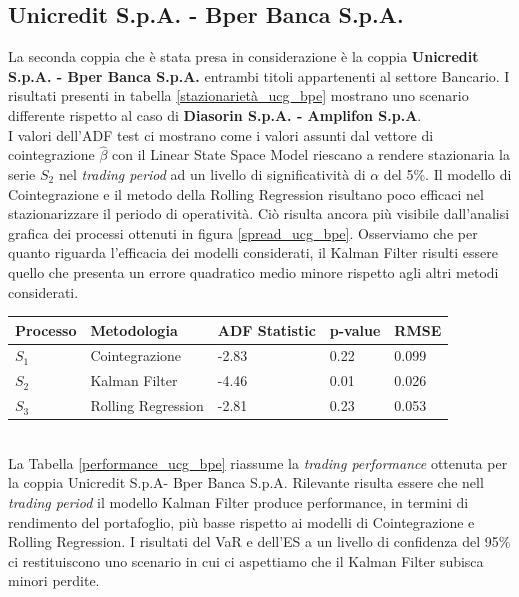 \documentclass[]{article}
\begin{document}
\break
\break
\subsection*{Unicredit S.p.A. - Bper Banca S.p.A.}
La seconda coppia che è stata presa in considerazione è la coppia \textbf{Unicredit S.p.A. - Bper Banca S.p.A.} entrambi titoli appartenenti al settore Bancario.
I risultati presenti in tabella \ref{stazionarietà_ucg_bpe} mostrano uno scenario differente rispetto al caso di \textbf{Diasorin S.p.A. - Amplifon S.p.A}.
\\
I valori dell'ADF test ci mostrano come  i valori assunti dal vettore di cointegrazione $\hat{\beta}$ con il Linear State Space Model riescano a rendere stazionaria la serie $S_2$ nel \textit{trading period} ad un livello di significatività di $\alpha$ del 5\%. 
Il modello di Cointegrazione e il metodo della Rolling Regression risultano poco efficaci nel stazionarizzare il periodo di operatività. Ciò risulta ancora più visibile dall'analisi grafica dei processi ottenuti in figura \ref{spread_ucg_bpe}.
Osserviamo che per quanto riguarda l'efficacia dei modelli considerati, il Kalman Filter risulti essere quello che presenta un errore quadratico medio minore rispetto agli altri metodi considerati.

\begin{center}
	\label{stazionarietà_ucg_bpe}
	\begin{tabular}{ p{2cm}p{3cm}p{1cm}p{2cm}p{1cm}}
	\hline
	Processo & Metodologia & ADF Statistic & p-value & RMSE \\
	\hline
	$S_1$ & Cointegrazione & -2.83 & 0.22 & 0.099 \\
	$S_2$ & Kalman Filter & -4.46 & 0.01  & 0.026 \\
	$S_3$ & Rolling Regression & -2.81 & 0.23 & 0.053 \\
	\hline
	\end{tabular}
\end{center}
\
\\
La Tabella \ref{performance_ucg_bpe} riassume la \textit{trading performance} ottenuta per la coppia Unicredit S.p.A- Bper Banca S.p.A.
Rilevante risulta essere che nell \textit{trading period} il modello Kalman Filter produce performance, in termini di rendimento del portafoglio, più basse rispetto ai modelli di Cointegrazione e Rolling Regression.
I risultati del VaR e dell'ES a un livello di confidenza del 95\% ci restituiscono uno scenario in cui ci aspettiamo che il Kalman Filter subisca minori perdite.
\end{document}
